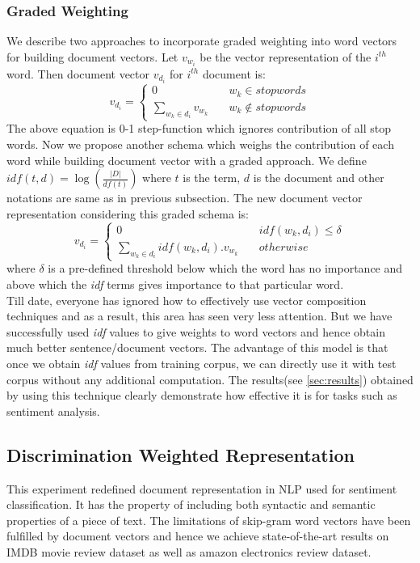 \documentclass[11pt,a4paper]{article}
\begin{document}
\subsubsection{Graded Weighting}
\label{sec:graded_weighting}
We describe two approaches to incorporate graded weighting into word vectors for building document vectors. Let $v_{w_i}$ be the vector representation of the $i^{th}$ word. Then document vector $v_{d_i}$ for $i^{th}$ document is:
$$
v_{d_i} = \left\{
        \begin{array}{ll}
            0 & \quad w_k \in stopwords \\
            \sum\limits_{w_k \in d_i} v_{w_k} & \quad w_k \notin stopwords
        \end{array}
    \right.
$$
The above equation is 0-1 step-function which ignores contribution of all stop words. Now we propose another schema which weighs the contribution of each word while building document vector with a graded approach. We define $idf(t,d)=\log(\frac{|D|}{df(t)})$ where $t$ is the term, $d$ is the document and other notations are same as in previous subsection. The new document vector representation considering this graded schema is:
$$
v_{d_i} = \left\{
        \begin{array}{ll}
            0 & \quad idf(w_k,d_i) \leq \delta \\
            \sum\limits_{w_k \in d_i} idf(w_k,d_i).v_{w_k} & \quad otherwise
        \end{array}
    \right.
$$
where $\delta$ is a pre-defined threshold below which the word has no importance and above which the \emph{idf} terms gives importance to that particular word.\\
Till date, everyone has ignored how to effectively use vector composition techniques and as a result, this area has seen very less attention. But we have successfully used \emph{idf} values to give weights to word vectors and hence obtain much better sentence/document vectors. The advantage of this model is that once we obtain \emph{idf} values from training corpus, we can directly use it with test corpus without any additional computation. The results(see \ref{sec:results}) obtained by using this technique clearly demonstrate how effective it is for tasks such as sentiment analysis.

\subsection{Discrimination Weighted Representation}
This experiment redefined document representation in NLP used for sentiment classification. It has the property of including both syntactic and semantic properties of a piece of text. The limitations of skip-gram word vectors have been fulfilled by document vectors and hence we achieve state-of-the-art results on IMDB movie review dataset as well as amazon electronics review dataset.
\end{document}
